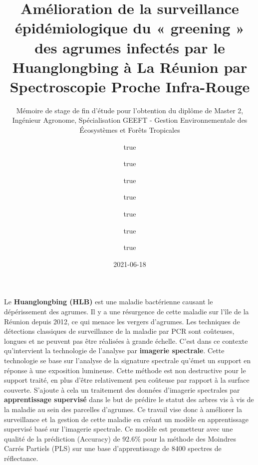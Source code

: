 \documentclass[
  11pt,
  french,
  a4paper,
  extrafontsizes,onecolumn,openright
  ]{memoir}
\title{Amélioration de la surveillance épidémiologique du « greening » des agrumes infectés par le Huanglongbing à La Réunion par Spectroscopie Proche Infra-Rouge}
\subtitle{Mémoire de stage de fin d'étude pour l'obtention du diplôme de Master 2, Ingénieur Agronome, Spécialisation GEEFT - Gestion Environnementale des Écosystèmes et Forêts Tropicales}
\author{true \and true \and true \and true \and true \and true \and true}
\date{2021-06-18}
\begin{document}
\frontmatter



\cleardoublepage



\begin{description}

\item[Résumé:]
Le \textbf{Huanglongbing (HLB)} est une maladie bactérienne causant le dépérissement des agrumes. Il y a une résurgence de cette maladie sur l'île de la Réunion depuis 2012, ce qui menace les vergers d'agrumes. Les techniques de détections classiques de surveillance de la maladie par PCR sont coûteuses, longues et ne peuvent pas être réalisées à grande échelle. C'est dans ce contexte qu'intervient la technologie de l'analyse par \textbf{imagerie spectrale}. Cette technologie se base sur l'analyse de la signature spectrale qu'émet un support en réponse à une exposition lumineuse. Cette méthode est non destructive pour le support traité, en plus d'être relativement peu coûteuse par rapport à la surface couverte. S'ajoute à cela un traitement des données d'imagerie spectrales par \textbf{apprentissage supervisé} dans le but de prédire le statut des arbres vis à vis de la maladie au sein des parcelles d'agrumes. Ce travail vise donc à améliorer la surveillance et la gestion de cette maladie en créant un modèle en apprentissage supervisé basé sur l'imagerie spectrale. Ce modèle est prometteur avec une qualité de la prédiction (Accuracy) de 92.6\% pour la méthode des Moindres Carrés Partiels (PLS) sur une base d'apprentissage de 8400 spectres de réflectance.


\end{description}
\end{document}
